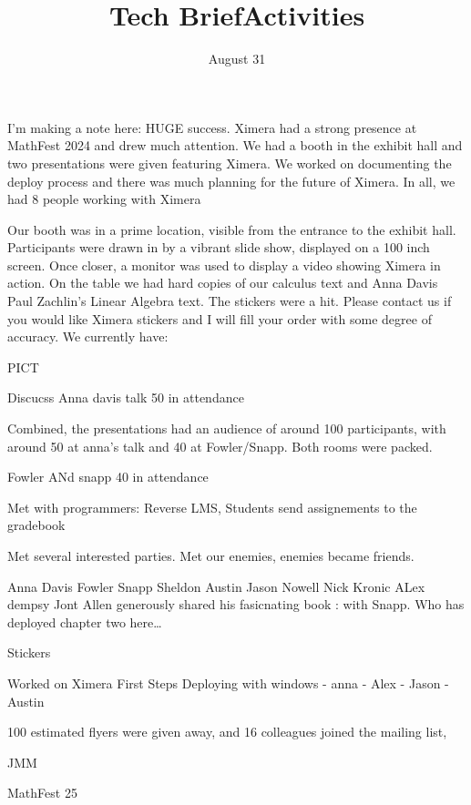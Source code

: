 \documentclass{techbrief}
\title{Tech Brief}
\title{Activities}
\date{August 31}
\begin{document}
\pagestyle{main}
\thispagestyle{title}
\noindent

I'm making a note here: HUGE success. 
Ximera had a strong presence at MathFest 2024 and drew much attention. 
We had a booth in the exhibit hall and two presentations were given featuring Ximera. 
We worked on documenting the deploy process and there was much planning for the future of Ximera.
In all, we had 8 people working with Ximera




Our booth was in a prime location, visible from the entrance to the exhibit hall.
Participants were drawn in by a vibrant slide show, displayed on a 100 inch screen.
Once closer, a monitor was used to display a video showing Ximera in action. 
On the table we had hard copies of our calculus text and Anna Davis Paul Zachlin's Linear Algebra text.
The stickers were a hit.
Please contact us if you would like Ximera stickers and I will fill your order with some degree of accuracy.
We currently have: 

PICT


Discucss Anna davis talk 50 in attendance


Combined, the presentations had an audience of around 100 participants, with around 50 at anna's talk and 40 at Fowler/Snapp.
Both rooms were packed. 

Fowler ANd snapp 40 in attendance

Met with programmers: Reverse LMS, Students send assignements to the gradebook

Met several interested parties. Met our enemies, enemies became friends. 

Anna Davis
Fowler
Snapp
Sheldon
Austin
Jason Nowell
Nick Kronic
ALex dempsy 
Jont Allen generously shared his fasicnating book :  with Snapp. Who has deployed chapter two here\dots


Stickers


Worked on Ximera First Steps
Deploying with windows
- anna
- Alex
- Jason
- Austin


100 estimated flyers were given away, and 
16 colleagues joined the mailing list, 

JMM

MathFest 25
\end{document}
